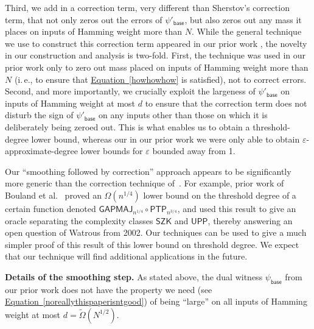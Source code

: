 \documentclass[11pt]{article}
\numberwithin{equation}{section}
\theoremstyle{definition}
\theoremstyle{plain}
\newcommand{\ie}{i.\,e.}
\newcommand{\expeqref}[2]{\hyperref[#2]{#1~\eqref{#2}}}
\newcommand{\eps}{\varepsilon}
\begin{document}
Third, we add in a correction term, very different than Sherstov's correction term, that not only zeros out the errors of $\psi'_{\textsf{base}}$,
but also zeros out any mass it places on inputs of Hamming weight more than $N$. While the general technique we use to construct
this correction term appeared in our prior %
work \cite{adegsurj, bkt}, the novelty in our construction and analysis is two-fold.
First, the technique was used in our prior work only to zero out mass placed on inputs of Hamming weight more than $N$ (\ie, to ensure that
\expeqref{Equation}{howhowhow} is satisfied), not to correct errors. Second, and more importantly, 
we crucially exploit the largeness of $\psi'_{\textsf{base}}$ on inputs of Hamming weight at most $d$ to
ensure that the correction term does not disturb the sign of $\psi'_{\textsf{base}}$ on any inputs other 
than those on which it is deliberately being zeroed out. This is what enables us 
to obtain a %
threshold-degree  %
lower bound, whereas our
%
in our prior work we %
were only able to obtain %
$\eps$-approximate-degree %
lower bounds for $\eps$ bounded away from 1. 

\medskip
Our ``smoothing followed by correction'' approach appears to be significantly more generic than the correction technique of~\cite{sherstov15}. For example, prior work of Bouland et al.~\cite{bchtv} proved an $\Omega(n^{1/4})$ lower bound on the threshold degree of a certain function denoted $\mathsf{GAPMAJ}_{n^{1/4}} \circ \mathsf{PTP}_{n^{3/4}}$, and used this result to give an oracle separating the complexity classes $\textsf{SZK}$ and $\textsf{UPP}$, thereby answering
an open question of Watrous from 2002. Our techniques can be used to give a 
much simpler proof of this result of this %
lower bound on threshold degree. %
We expect that our technique will find additional applications in the future. 

\medskip \noindent \textbf{Details of the smoothing step.}
As stated above, the dual witness $\psi_{\textsf{base}}$ from our prior work
does not %
have %
the property we need
%
(see \expeqref{Equation}{noreallythispaperisntgood})  %
of being ``large'' on all inputs of Hamming weight at most
$d=\tilde{\Omega}(N^{1/2})$. 
\end{document}
